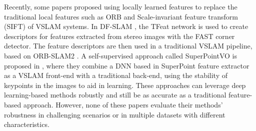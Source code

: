 Recently, some papers proposed using locally learned features to replace the traditional local features such as ORB and Scale-invariant feature transform (SIFT) of VSLAM systems. In DF-SLAM \cite{df-slam}, the TFeat network \cite{tfeat} is used to create descriptors for features extracted from stereo images with the FAST corner detector. The feature descriptors are then used in a traditional VSLAM pipeline, based on ORB-SLAM2 \cite{orb-slam2}. A self-supervised approach called SuperPointVO is proposed in \cite{self-improving-vo}, where they combine a DNN based in SuperPoint \cite{superpoint} feature extractor as a VSLAM front-end with a traditional back-end, using the stability of keypoints in the images to aid in learning. These approaches can leverage deep learning-based methods robustly and still be as accurate as a traditional feature-based approach. However, none of these papers evaluate their methods' robustness in challenging scenarios or in multiple datasets with different characteristics.